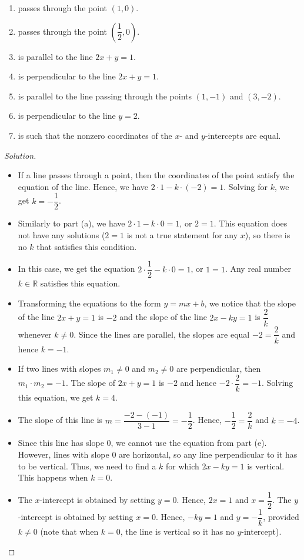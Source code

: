 \documentclass[12pt]{article}
\newenvironment{solution}{\begin{proof}[Solution]}{\end{proof}}
\begin{document}
\begin{enumerate}
\begin{enumerate}
			\item passes through the point $(1,0)$.
			
			\item passes through the point $(\dfrac{1}{2},0)$.
		
			\item is parallel to the line $2x+y=1$.
		
			\item is perpendicular to the line $2x+y=1$.
			
			\item is parallel to the line passing through the points $(1,-1)$ and $(3,-2)$.
		
			\item is perpendicular to the line $y=2$.
		
			\item is such that the nonzero coordinates of the $x$- and $y$-intercepts are equal.
			\end{enumerate}
			
			\begin{solution}
				\begin{itemize}
					\item[(a)] 	If a line passes through a point, then the coordinates of the point satisfy the equation of the line. Hence, we have $2\cdot1-k\cdot(-2)=1$. Solving for $k$, we get $k=-\dfrac{1}{2}$.
					\item[(b)] 	Similarly to part (a), we have $2\cdot 1-k\cdot 0=1$, or $2=1$. This equation does not have any solutions ($2=1$ is not a true statement for any $x$), so there is no $k$ that satisfies this condition.
					\item[(c)] In this case, we get the equation $2\cdot\dfrac{1}{2}-k\cdot0=1$, or $1=1$. Any real number $k \in \mathbb{R}$ satisfies this equation.
					\item[(d)] 	Transforming the equations to the form $y=mx+b$, we notice that the slope of the line $2x+y=1$ is $-2$ and the slope of the line $2x-ky=1$ is $\dfrac{2}{k}$ whenever $k\neq0$. Since the lines are parallel, the slopes are equal $-2=\dfrac{2}{k}$ and hence $k=-1$.
					\item[(e)] 	If two lines with slopes $m_1\neq 0$ and $m_2\neq 0$ are perpendicular, then $m_1\cdot m_2=-1$. The slope of $2x+y=1$ is $-2$ and hence $-2\cdot\dfrac{2}{k}=-1$. Solving this equation, we get $k=4$.
					\item[(f)] The slope of this line is $m=\dfrac{-2-(-1)}{3-1}=-\dfrac{1}{2}$. Hence, $-\dfrac{1}{2}=\dfrac{2}{k}$ and $k=-4$.
					\item[(g)] Since this line has slope $0$, we cannot use the equation from part (e). However, lines with slope $0$ are horizontal, so any line perpendicular to it has to be vertical. Thus, we need to find a $k$ for which $2x-ky=1$ is vertical. This happens when $k=0$.
					\item[(h)] 	The $x$-intercept is obtained by setting $y=0$. Hence, $2x=1$ and $x=\dfrac{1}{2}$. The $y$-intercept is obtained by setting $x=0$. Hence, $-ky=1$ and $y=-\dfrac{1}{k}$, provided $k\neq 0$ (note that when $k=0$, the line is vertical so it has no $y$-intercept). 
					

\end{itemize}
\end{solution}
\end{enumerate}
\end{document}
